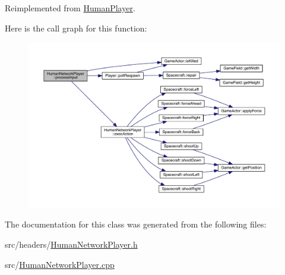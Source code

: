 Reimplemented from \hyperlink{class_human_player_a4298cb4a77be8ef79cc289baec199602}{Human\+Player}.



Here is the call graph for this function\+:\nopagebreak
\begin{figure}[H]
\begin{center}
\leavevmode
\includegraphics[width=350pt]{class_human_network_player_a3914e46fec4bd007fff44ec984599d94_cgraph}
\end{center}
\end{figure}




The documentation for this class was generated from the following files\+:\begin{DoxyCompactItemize}
\item 
src/headers/\hyperlink{_human_network_player_8h}{Human\+Network\+Player.\+h}\item 
src/\hyperlink{_human_network_player_8cpp}{Human\+Network\+Player.\+cpp}\end{DoxyCompactItemize}
